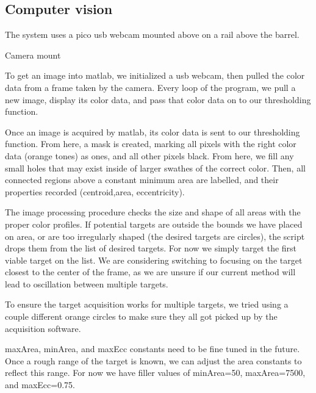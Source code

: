 ﻿\subsection{Computer vision}

The system uses a pico usb webcam mounted above on a rail above the barrel.
  
Camera mount

To get an image into matlab, we initialized a usb webcam, then pulled the color data from a frame taken by the camera. Every loop of the program, we pull a new image, display its color data, and pass that color data on to our thresholding function.

Once an image is acquired by matlab, its color data is sent to our thresholding function. From here, a mask is created, marking all pixels with the right color data (orange tones) as ones, and all other pixels black. From here, we fill any small holes that may exist inside of larger swathes of the correct color. Then, all connected regions above a constant minimum area are labelled, and their properties recorded (centroid,area, eccentricity). 

The image processing procedure checks the size and shape of all areas with the proper color profiles. If potential targets are outside the bounds we have placed on area, or are too irregularly shaped (the desired targets are circles), the script drops them from the list of desired targets. For now we simply target the first viable target on the list. We are considering switching to focusing on the target closest to the center of the frame, as we are unsure if our current method will lead to oscillation between multiple targets.

To ensure the target acquisition works for multiple targets, we tried using a couple different orange circles to make sure they all got picked up by the acquisition software. 

maxArea, minArea, and maxEcc constants need to be fine tuned in the future. Once a rough range of the target is known, we can adjust the area constants to reflect this range. For now we have filler values of minArea=50, maxArea=7500, and maxEcc=0.75.

